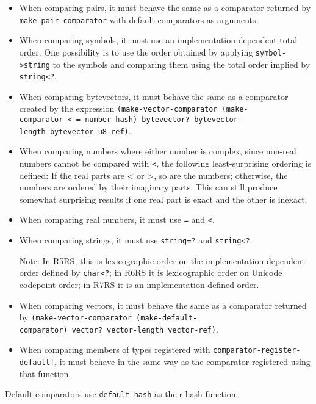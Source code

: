 \begin{entry}{%
  }
\begin{itemize}
  Note: In R5RS, this is an implementation-dependent order that is
  typically the same as Unicode codepoint order; in R6RS and R7RS, it
  is Unicode codepoint order.
\item When comparing pairs, it must behave the same as a comparator
  returned by \texttt{make-pair-comparator} with default comparators
  as arguments.
\item When comparing symbols, it must use an implementation-dependent
  total order. One possibility is to use the order obtained by
  applying \texttt{symbol->string} to the symbols and comparing them
  using the total order implied by \texttt{string<?}.
\item When comparing bytevectors, it must behave the same as a
  comparator created by the expression
  \texttt{(make-vector-comparator\ (make-comparator\ <\ =\
    number-hash)\ bytevector?\ bytevector-length\ bytevector-u8-ref)}.
\item When comparing numbers where either number is complex, since
  non-real numbers cannot be compared with \texttt{<}, the following
  least-surprising ordering is defined: If the real parts are < or >,
  so are the numbers; otherwise, the numbers are ordered by their
  imaginary parts. This can still produce somewhat surprising results
  if one real part is exact and the other is inexact.
\item When comparing real numbers, it must use \texttt{=} and
  \texttt{<}.
\item When comparing strings, it must use \texttt{string=?} and
  \texttt{string<?}.

  Note: In R5RS, this is lexicographic order on the
  implementation-dependent order defined by \texttt{char<?}; in R6RS
  it is lexicographic order on Unicode codepoint order; in R7RS it is
  an implementation-defined order.
\item When comparing vectors, it must behave the same as a comparator
  returned by \texttt{(make-vector-comparator\
    (make-default-comparator)\ vector?\ vector-length\ vector-ref)}.
\item When comparing members of types registered with
  \texttt{comparator-register-default!}, it must behave in the same
  way as the comparator registered using that function.
\end{itemize}

Default comparators use \texttt{default-hash} as their hash function.
\end{entry}

